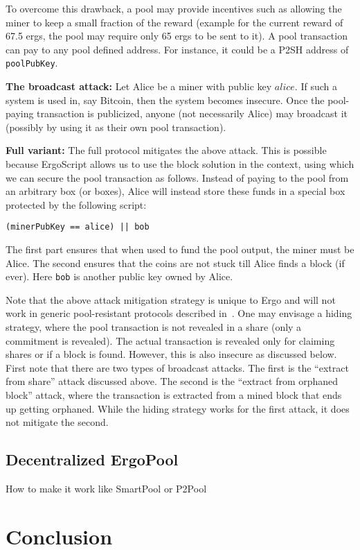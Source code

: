 \documentclass[11pt]{article}
\newcommand{\langname}{ErgoScript\xspace}
\newcommand{\poolname}{ErgoPool\xspace}
\begin{document}
 To overcome this drawback, a pool may provide incentives such as allowing the miner to keep a small fraction of the reward (example for the current reward of 67.5 ergs, the pool may require only 65 ergs to be sent to it). A pool transaction can pay to any pool defined address. For instance, it could be a P2SH address of \texttt{poolPubKey}. 


\textbf{The broadcast attack:} Let Alice be a miner with public key $alice$. If such a system is used in, say Bitcoin, then the system becomes insecure. Once the pool-paying transaction is publicized, anyone (not necessarily Alice) may broadcast it (possibly by using it as their own pool transaction). 

\textbf{Full variant:} The full protocol mitigates the above attack. This is possible because \langname allows us to use the block solution in the context, using which we can secure the pool transaction as follows. Instead of paying to the pool from an arbitrary box (or boxes), Alice will instead store these funds in a special box protected by the following script:
\begin{verbatim}
(minerPubKey == alice) || bob
\end{verbatim}
The first part ensures that when used to fund the pool output, the miner must be Alice. The second ensures that the coins are not stuck till Alice finds a block (if ever). Here \texttt{bob} is another public key owned by Alice.

Note that the above attack mitigation strategy is unique to Ergo and will not work in generic pool-resistant protocols described in~\cite{miller2015nonoutsourceable}. One may envisage a hiding strategy, where the pool transaction is not revealed in a share (only a commitment is revealed). The actual transaction is revealed only for claiming shares or if a block is found. However, this is also insecure as discussed below. First note that there are two types of broadcast attacks. The first is the ``extract from share'' attack discussed above. The second is the ``extract from orphaned block'' attack, where the transaction is extracted from a mined block that ends up getting orphaned. While the hiding strategy works for the first attack, it does not mitigate the second. 





\subsection{Decentralized \poolname}

How to make it work like SmartPool or P2Pool

\section{Conclusion}



\appendix
\end{document}
